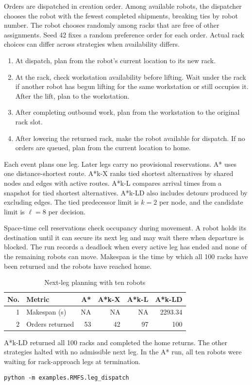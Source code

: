 \documentclass[11pt]{article}
\begin{document}
Orders are dispatched in creation order. Among available robots, the dispatcher chooses the robot with the fewest completed shipments, breaking ties by robot number. The robot chooses randomly among racks that are free of other assignments. Seed 42 fixes a random preference order for each order. Actual rack choices can differ across strategies when availability differs.

\begin{enumerate}
\item At dispatch, plan from the robot's current location to its new rack.
\item At the rack, check workstation availability before lifting. Wait under the rack if another robot has begun lifting for the same workstation or still occupies it. After the lift, plan to the workstation.
\item After completing outbound work, plan from the workstation to the original rack slot.
\item After lowering the returned rack, make the robot available for dispatch. If no orders are queued, plan from the current location to home.
\end{enumerate}

Each event plans one leg. Later legs carry no provisional reservations. A* uses one distance-shortest route. A*k-X ranks tied shortest alternatives by shared nodes and edges with active routes. A*k-L compares arrival times from a snapshot for tied shortest alternatives. A*k-LD also includes detours produced by excluding edges. The tied predecessor limit is $k=2$ per node, and the candidate limit is $\ell=8$ per decision.

Space-time cell reservations check occupancy during movement. A robot holds its destination until it can secure its next leg and may wait there when departure is blocked. The run records a deadlock when every active leg has ended and none of the remaining robots can move. Makespan is the time by which all 100 racks have been returned and the robots have reached home.

\begin{table}[htbp]
\centering
\caption{Next-leg planning with ten robots}
\label{tab:next-leg-dispatch}
\begin{tabular}{rlrrrr}
\hline
No. & Metric & A* & A*k-X & A*k-L & A*k-LD\\
\hline
1 & Makespan (s) & NA & NA & NA & 2293.34\\
2 & Orders returned & 53 & 42 & 97 & 100\\
\hline
\end{tabular}
\end{table}

A*k-LD returned all 100 racks and completed the home returns. The other strategies halted with no admissible next leg. In the A* run, all ten robots were waiting for rack-approach legs at termination.

\begin{verbatim}
python -m examples.RMFS.leg_dispatch
\end{verbatim}
\end{document}
